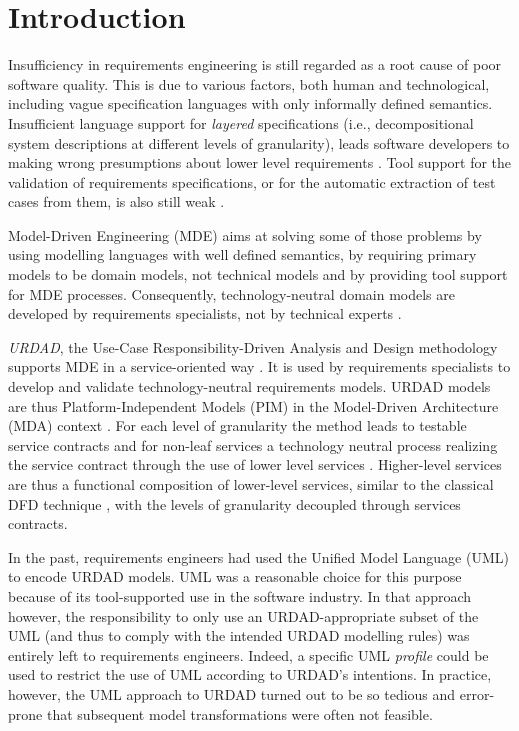 \section{Introduction}
Insufficiency in requirements engineering is still regarded as a root cause of poor software quality. This is due to various factors, both human and technological, including vague specification languages with only informally defined semantics. Insufficient language support for \emph{layered} specifications (i.e., decompositional system descriptions at different levels of granularity), leads software developers to making wrong presumptions about lower level requirements \cite{espana_evaluating_2009}. Tool support for the validation of requirements specifications, or for the automatic extraction of test cases from them, is also still weak \cite{bashardoust-tajali_extracting_2008}.

Model-Driven Engineering (MDE) \cite{schmidt_model_2006} aims at solving some of those problems by using modelling languages with well defined semantics, by requiring primary models to be domain models, not technical models \cite{asnina_computation_2010} and by providing tool support for MDE processes. Consequently, technology-neutral domain models are developed by requirements specialists, not by technical experts \cite{asnina_computation_2010}.

\emph{URDAD}, the Use-Case Responsibility-Driven Analysis and Design methodology \cite{fritz_solms_technology_2007} supports MDE in a service-oriented way \cite{solms_urdad_2010}. It is used by requirements specialists to develop and validate technology-neutral requirements models. URDAD models are thus Platform-Independent Models (PIM) in the Model-Driven Architecture (MDA) context \cite{solms_urdad_2010}. For each level of granularity the method leads to testable service contracts and for non-leaf services a technology neutral process realizing the service contract through the use of lower level services . Higher-level services are thus a functional composition of lower-level services, similar to the classical DFD technique \cite{demarco_tom_structured_1978}, with the levels of granularity decoupled through services contracts.

In the past, requirements engineers had used the Unified Model Language (UML) to encode URDAD models. UML was a reasonable choice for this purpose because of its tool-supported use in the software industry. In that approach however, the responsibility to only use an URDAD-appropriate subset of the UML (and thus to comply with the intended URDAD modelling rules) was entirely left to requirements engineers. Indeed, a specific UML \emph{profile} could be used to restrict the use of UML according to URDAD's intentions. In practice, however, the UML approach to URDAD turned out to be so tedious and error-prone that subsequent model transformations were often not feasible.

